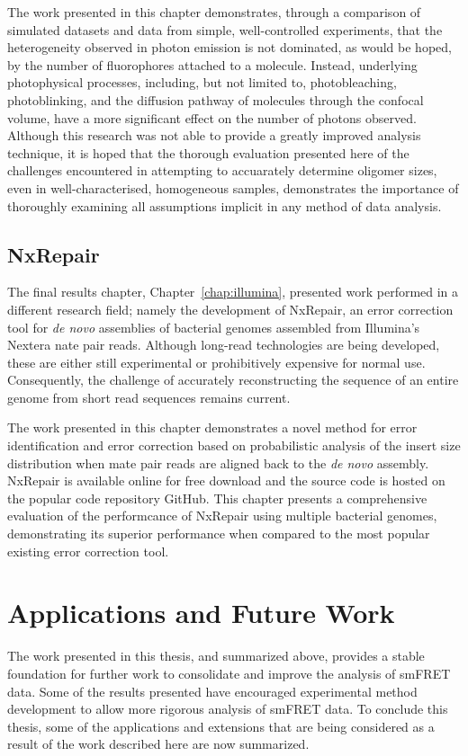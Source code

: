 The work presented in this chapter demonstrates, through a comparison of simulated datasets and data from simple, well-controlled experiments, that the heterogeneity observed in photon emission is not dominated, as would be hoped, by the number of fluorophores attached to a molecule. Instead, underlying photophysical processes, including, but not limited to, photobleaching, photoblinking, and the diffusion pathway of molecules through the confocal volume, have a more significant effect on the number of photons observed. Although this research was not able to provide a greatly improved analysis technique, it is hoped that the thorough evaluation presented here of the challenges encountered in attempting to accuarately determine oligomer sizes, even in well-characterised, homogeneous samples, demonstrates the importance of thoroughly examining all assumptions implicit in any method of data analysis.   

\subsection{NxRepair}
The final results chapter, Chapter~\ref{chap:illumina}, presented work performed in a different research field; namely the development of NxRepair, an error correction tool for \emph{de novo} assemblies of bacterial genomes assembled from Illumina's Nextera nate pair reads. Although long-read technologies are being developed, these are either still experimental or prohibitively expensive for normal use. Consequently, the challenge of accurately reconstructing the sequence of an entire genome from short read sequences remains current. 

The work presented in this chapter demonstrates a novel method for error identification and error correction based on probabilistic analysis of the insert size distribution when mate pair reads are aligned back to the \emph{de novo} assembly. NxRepair is available online for free download and the source code is hosted on the popular code repository GitHub.  This chapter presents a comprehensive evaluation of the performcance of NxRepair using multiple bacterial genomes, demonstrating its superior performance when compared to the most popular existing error correction tool.

\section{Applications and Future Work}
The work presented in this thesis, and summarized above, provides a stable foundation for further work to consolidate and improve the analysis of smFRET data. Some of the results presented have encouraged experimental method development to allow more rigorous analysis of smFRET data. To conclude this thesis, some of the applications and extensions that are being considered as a result of the work described here are now summarized. 

